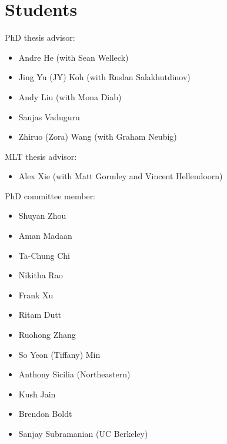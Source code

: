 


\section{Students}
PhD thesis advisor:
\begin{itemize}
  \item Andre He (with Sean Welleck)
  \item Jing Yu (JY) Koh (with Ruslan Salakhutdinov)
  \item Andy Liu (with Mona Diab)
  \item Saujas Vaduguru
  \item Zhiruo (Zora) Wang (with Graham Neubig)
\end{itemize}
MLT thesis advisor:
\begin{itemize}
  \item Alex Xie (with Matt Gormley and Vincent Hellendoorn)
\end{itemize}
PhD committee member:
\begin{itemize}
  \item Shuyan Zhou
  \item Aman Madaan
  \item Ta-Chung Chi
  \item Nikitha Rao
  \item Frank Xu
  \item Ritam Dutt
  \item Ruohong Zhang
  \item So Yeon (Tiffany) Min
  \item Anthony Sicilia (Northeastern)
  \item Kush Jain
  \item Brendon Boldt
  \item Sanjay Subramanian (UC Berkeley)
\end{itemize}


